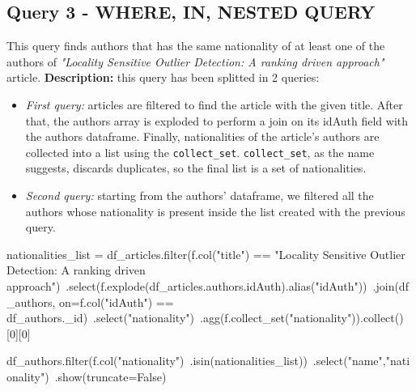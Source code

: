 \documentclass{Configuration_Files/PoliMi3i_thesis}
\begin{document}
\subsection{Query 3 - WHERE, IN, NESTED QUERY}
This query finds authors that has the same nationality of at least one of the authors of \emph{"Locality Sensitive Outlier
Detection: A ranking driven approach"} article.\newline
\textbf{Description:} this query has been splitted in 2 queries:
                        \begin{itemize}
                            \item \emph{First query:} articles are filtered to find the article with the given title. After that,
                                the authors array is exploded to perform a join on its idAuth field with the authors dataframe.
                                Finally, nationalities of the article's authors are collected into a list using the \verb |collect_set|.\newline
                                \verb|collect_set|, as the name suggests, discards duplicates, so the final list is a set of nationalities.
                            \item \emph{Second query:} starting from the authors' dataframe, we filtered all the authors whose nationality is
                                present inside the list created with the previous query.\\
                        \end{itemize}
\begin{python}
nationalities_list = df_articles.filter(f.col("title") == "Locality Sensitive Outlier Detection: A ranking driven approach")\
                                .select(f.explode(df_articles.authors.idAuth).alias("idAuth"))\
                                .join(df_authors, on=f.col("idAuth") == df_authors._id)\
                                .select("nationality")\
                                .agg(f.collect_set("nationality")).collect()[0][0]

df_authors.filter(f.col("nationality")\
          .isin(nationalities_list))\
          .select("name","nationality")\
          .show(truncate=False)
\end{python}
\end{document}
